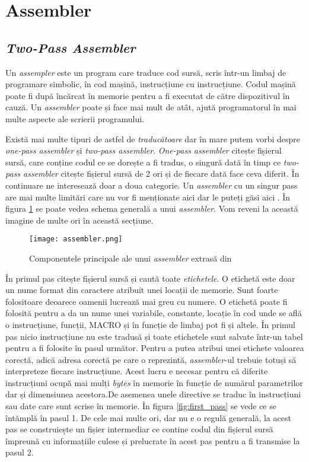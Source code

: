 \documentclass[../main.tex]{subfiles}
\begin{document}
\section{Assembler}
\subsection{\emph{Two-Pass Assembler}}
Un \emph{assempler} este un program care traduce cod sursă, scris într-un limbaj de programare simbolic, în cod mașină,
instrucțiune cu instrucțiune. Codul mașină poate fi după încărcat în memorie pentru a fi executat de către dispozitivul
în cauză. Un \emph{assembler} poate și face mai mult de atât, ajută programatorul în mai multe aspecte ale scrierii
programului.

Există mai multe tipuri de astfel de \emph{traducătoare} dar în mare putem vorbi despre \emph{one-pass assembler} și
\emph{two-pass assembler}. \emph{One-pass assembler} citește fișierul sursă, care conține codul ce se dorește a fi
tradus, o singură dată în timp ce \emph{two-pass assembler} citește fișierul sursă de 2 ori și de fiecare dată face
ceva diferit. În continuare ne interesează doar a doua categorie. Un \emph{assembler} cu un singur pass are mai multe
limitări care nu vor fi menționate aici dar le puteți găsi aici \cite{asl}. În figura \ref{fig:assembler} se poate 
vedea schema generală a unui \emph{assembler}. Vom reveni la această imagine de multe ori în această secțiune.

\begin{figure}[h]
    \centering
    \texttt{[image: assembler.png]}
    \caption{Componentele principale ale unui \emph{assembler} extrasă din \cite{asl}}
    \label{fig:assembler}
\end{figure}

În primul pas citește fișierul sursă și caută toate \emph{etichetele}. O etichetă este doar un nume format din caractere
atribuit unei locații de memorie. Sunt foarte folositoare deoarece oamenii lucrează mai greu cu numere. O etichetă poate
fi folosită pentru a da un nume unei variabile, constante, locație în cod unde se află o instrucțiune, funcții, MACRO
și în funcție de limbaj pot fi și altele. În primul pas nicio instrucțiune nu este tradusă și toate etichetele sunt
salvate într-un tabel pentru a fi folosite în pasul următor. Pentru a putea atribui unei etichete valoarea corectă,
adică adresa corectă pe care o reprezintă, \emph{assembler}-ul trebuie totuși să interpreteze fiecare instrucțiune.
Acest lucru e necesar pentru că diferite instrucțiuni ocupă mai mulți \emph{bytes} în memorie în funcție de numărul
parametrilor dar și dimensiunea acestora.De asemenea unele directive se traduc în instrucțiuni sau date care sunt scrise
în memorie. În figura \ref{fig:first_pass} se vede ce se întămplă în pasul 1.
De cele mai multe ori, dar nu e o regulă generală, la acest pas se construiește un fișier intermediar ce
contine codul din fișierul sursă împreună cu informațiile culese și prelucrate în acest pas pentru a fi transmise la
pasul 2.
\end{document}
